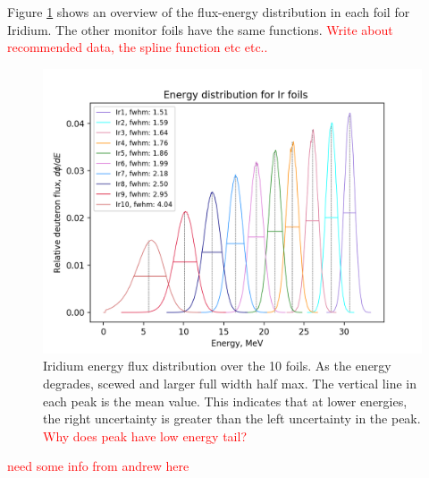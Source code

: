 \documentclass[a4paper,11pt,twoside]{book}
\begin{document}
Figure \ref{fig:ir_energyflux} shows an overview of the flux-energy distribution in each foil for Iridium. The other monitor foils have the same functions.  \textcolor{red}{Write about recommended data, the spline function etc etc.. }

\begin{figure}
    \centering
    \includegraphics{Analysis/Ir_flux_distribution_B_+2_D_+4,25.png}
    \caption{Iridium energy flux distribution over the 10 foils. As the energy degrades, scewed and larger full width half max. The vertical line in each peak is the mean value. This indicates that at lower energies, the right uncertainty is greater than the left uncertainty in the peak. \textcolor{red}{Why does peak have low energy tail?} }
    \label{fig:ir_energyflux}
\end{figure}

\textcolor{red}{need some info from andrew here}
\end{document}

